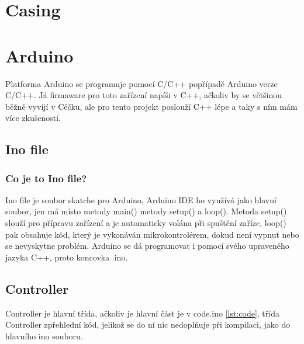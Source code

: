 
\section{Casing}

\section{Arduino}
Platforma Arduino se programuje pomocí C/C++ popřípadě Arduino verze C/C++. Já firmaware pro toto zařízení napíši v C++, ačkoliv by se většinou běžně vyvíjí v Céčku, ale pro tento projekt poslouží C++ lépe a taky s ním mám více zkušeností.

\subsection{Ino file}


\subsubsection{Co je to Ino file?}
Ino file je soubor skatche pro Arduino, Arduino IDE ho využívá jako hlavní soubor, jen má místo metody main() metody setup() a loop().  Metoda setup() slouží pro přípravu zařízení a je automaticky volána při spuštění zaříze,  loop() pak obsahuje kód, který je vykonáván mikrokontrolérem, dokud není vypnut nebo se nevyskytne problém. Arduino se dá programovat i pomocí svého upraveného jazyka C++, proto koncovka .ino.

\newpage
\subsection{Controller}

Controller je hlavní třída, ačkoliv je hlavní část je v code.ino \ref{lst:code}, třída Controller zpřehlední kód, jelikož se do ní nic nedoplňuje při kompilaci, jako do hlavního ino souboru.